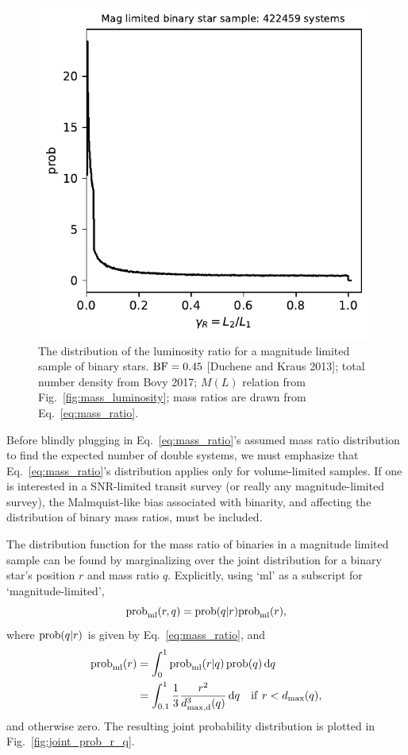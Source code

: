 \documentclass{emulateapj}
\begin{document}
\begin{figure}[!t]
	\begin{center}
		\includegraphics[scale=.8]{figures/gammaR_distribn_mag_limited.pdf}
	\end{center}
	\caption{The distribution of the luminosity ratio for a magnitude limited 
		sample of binary stars. ${\rm BF} = 0.45$ [Duchene and Kraus 2013]; 
		total 
		number density from Bovy 2017; $M(L)$ relation from 
		Fig.~\ref{fig:mass_luminosity}; mass ratios are drawn from 
		Eq.~\ref{eq:mass_ratio}.}
	\label{fig:gammaR_distribn_mag_limited}
\end{figure}


Before blindly plugging in Eq.~\ref{eq:mass_ratio}'s assumed mass ratio 
distribution to find the expected number of double systems, we must
emphasize that Eq.~\ref{eq:mass_ratio}'s distribution applies only for 
volume-limited samples.
If one is interested in a SNR-limited transit survey (or really any
magnitude-limited survey), the Malmquist-like bias associated with binarity, 
and affecting the distribution of binary mass ratios, must be included.

The distribution function for the mass ratio of binaries in a magnitude 
limited sample can be found by marginalizing over the joint 
distribution for a binary star's position $r$ and mass ratio $q$.
Explicitly, using `ml' as a subscript for `magnitude-limited',
\begin{equation}
{\rm prob}_{\rm ml}(r,q) = {\rm prob}(q|r){\rm prob}_{\rm ml}(r),
\end{equation} 
where ${\rm prob}(q|r)$ is given by Eq.~\ref{eq:mass_ratio}, and 
\begin{align}
{\rm prob}_{\rm ml}(r) &= \int_{0}^{1} {\rm prob}_{\rm ml}(r|q)\,{\rm 
	prob}(q)\,{\rm d}q
\\
&= \int_{0.1}^{1} \frac{1}{3} \frac{r^2}{d_{\rm max,d}^3(q)}\,{\rm d}q
\quad {\rm if\ }r<d_{\rm max}(q),
\end{align}
and otherwise zero. The resulting joint probability distribution is plotted in 
Fig.~\ref{fig:joint_prob_r_q}.
\end{document}
